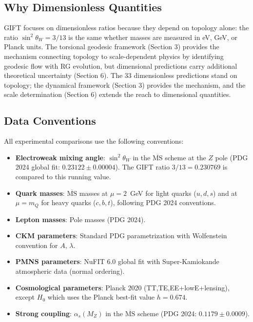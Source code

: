 \documentclass[11pt,a4paper]{article}
\begin{document}
\subsection{Why Dimensionless Quantities}

GIFT focuses on dimensionless ratios because they depend on topology alone: the ratio $\sin^2\theta_W = 3/13$ is the same whether masses are measured in eV, GeV, or Planck units. The torsional geodesic framework (Section 3) provides the mechanism connecting topology to scale-dependent physics by identifying geodesic flow with RG evolution, but dimensional predictions carry additional theoretical uncertainty (Section 6). The 33 dimensionless predictions stand on topology; the dynamical framework (Section 3) provides the mechanism, and the scale determination (Section 6) extends the reach to dimensional quantities.

\subsection{Data Conventions}

All experimental comparisons use the following conventions:

\begin{itemize}
\item \textbf{Electroweak mixing angle}: $\sin^2\theta_W$ in the $\overline{\mathrm{MS}}$ scheme at the $Z$ pole (PDG 2024 global fit: $0.23122 \pm 0.00004$). The GIFT ratio $3/13 = 0.230769$ is compared to this running value.
\item \textbf{Quark masses}: $\overline{\mathrm{MS}}$ masses at $\mu = 2$~GeV for light quarks ($u, d, s$) and at $\mu = m_Q$ for heavy quarks ($c, b, t$), following PDG 2024 conventions.
\item \textbf{Lepton masses}: Pole masses (PDG 2024).
\item \textbf{CKM parameters}: Standard PDG parametrization with Wolfenstein convention for $A$, $\lambda$.
\item \textbf{PMNS parameters}: NuFIT 6.0 global fit with Super-Kamiokande atmospheric data (normal ordering).
\item \textbf{Cosmological parameters}: Planck 2020 (TT,TE,EE+lowE+lensing), except $H_0$ which uses the Planck best-fit value $h = 0.674$.
\item \textbf{Strong coupling}: $\alpha_s(M_Z)$ in the $\overline{\mathrm{MS}}$ scheme (PDG 2024: $0.1179 \pm 0.0009$).
\end{itemize}
\end{document}
